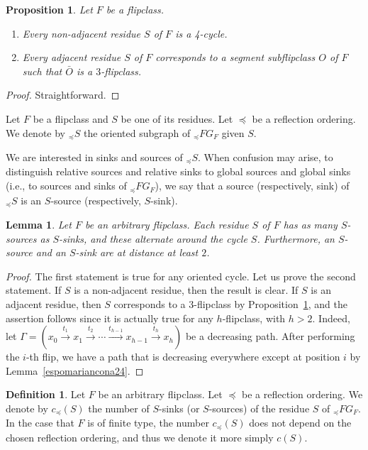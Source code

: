\documentclass[12pt,reqno]{amsart}
\theoremstyle{plain}
\newtheorem{pro}[thm]{Proposition}
\newtheorem{lem}[thm]{Lemma}
\theoremstyle{definition}
\newtheorem{defn}[thm]{Definition}
\theoremstyle{remark}
\begin{document}
\begin{pro}
\label{corrisponde}
Let $F$ be a flipclass.
\begin{enumerate}
\item Every non-adjacent residue $S$ of $F$ is a 4-cycle.
\item Every adjacent residue $S$ of $F$ corresponds to a segment subflipclass $O$ of $F$ such that $\bar{O}$ is a $3$-flipclass.
\end{enumerate}
\end{pro}
\begin{proof}
Straightforward.
\end{proof}

Let $F$ be a flipclass and $S$  be one of its  residues. Let $\preceq$ be a reflection ordering. We denote by $_{\preceq}S$ the oriented subgraph of $_{\preceq}FG_F$ given $S$.

We are interested in sinks and sources of $_{\preceq}S$. 
When confusion may arise, to distinguish relative sources and relative sinks to global sources and global sinks (i.e., to sources and sinks of  $_{\preceq}FG_F$), we say that a source (respectively, sink) of $_{\preceq}S$ is an $S$-source (respectively, $S$-sink).
\begin{lem}
\label{alternato}
Let $F$ be an arbitrary flipclass. 
Each residue $S$ of $F$ has as many $S$-sources as $S$-sinks, and these alternate around the cycle $S$. Furthermore, an $S$-source and an $S$-sink are at distance at least $2$.
\end{lem}
\begin{proof}
The first statement  is true for any oriented cycle. Let us prove the second statement. If $S$ is a non-adjacent residue, then the result is clear. If $S$ is an adjacent residue, then $S$ corresponds to a $3$-flipclass by Proposition~\ref{corrisponde}, and the assertion follows since it is actually true for any $h$-flipclass, with $h>2$. Indeed, let $\Gamma = (x_0 \stackrel{t_1}{\longrightarrow} x_1 \stackrel{t_2}{\longrightarrow}  \cdots \stackrel{t_{h-1}}{\longrightarrow} x_{h-1}\stackrel{t_h}{\longrightarrow}  x_h)$  be a decreasing  path. After performing the $i$-th flip, we have a path that is decreasing everywhere except at position $i$ by Lemma~\ref{espomariancona24}.
\end{proof}

\begin{defn}
Let $F$ be an arbitrary flipclass. Let $\preceq$ be a reflection ordering. We denote by $c_{\preceq}(S)$ the number of $S$-sinks (or $S$-sources) of the residue $S$ of $_{\preceq}FG_F$. In the case that $F$ is of finite type, the number $c_{\preceq}(S)$ does not depend on the chosen reflection ordering, and thus we denote it more simply $c(S)$.
\end{defn}
\end{document}
